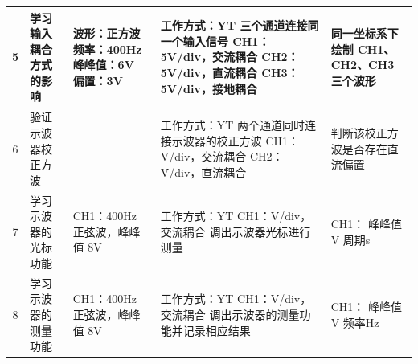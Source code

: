 \documentclass[12pt,a4paper]{article}
\begin{document}
\begin{longtable}{|c|p{2cm}|p{2.5cm}|p{4.5cm}|p{4cm}|}
        \hline
        5 & 学习输入耦合方式的影响 & 波形：正方波 \newline 频率：400Hz \newline 峰峰值：6V \newline 偏置：3V & 工作方式：YT \newline 三个通道连接同一个输入信号 \newline CH1：5V/div，交流耦合 \newline CH2：5V/div，直流耦合 \newline CH3：5V/div，接地耦合 & 同一坐标系下绘制 CH1、CH2、CH3 三个波形  \\
        \hline
        6 & 验证示波器校正方波 & & 工作方式：YT \newline 两个通道同时连接示波器的校正方波 \newline CH1：\uline{\phantom{\hspace{2cm}}}V/div，交流耦合 \newline CH2：\uline{\phantom{\hspace{2cm}}}V/div，直流耦合 & 判断该校正方波是否存在直流偏置  \\
        \hline
        7 & 学习示波器的光标功能 & CH1：400Hz 正弦波，峰峰值 8V \newline  & 工作方式：YT \newline CH1：\uline{\phantom{\hspace{2cm}}}V/div，交流耦合  \newline 调出示波器光标进行测量 & CH1： \newline 峰峰值\uline{\phantom{\hspace{2cm}}}V \newline 周期\uline{\phantom{\hspace{2cm}}}s \\
        \hline
        8 & 学习示波器的测量功能 & CH1：400Hz 正弦波，峰峰值 8V \newline  & 工作方式：YT \newline CH1：\uline{\phantom{\hspace{2cm}}}V/div，交流耦合 \newline 调出示波器的测量功能并记录相应结果 & CH1： \newline 峰峰值\uline{\phantom{\hspace{2cm}}}V \newline 频率\uline{\phantom{\hspace{2cm}}}Hz \newline \\
\end{longtable}
\end{document}
